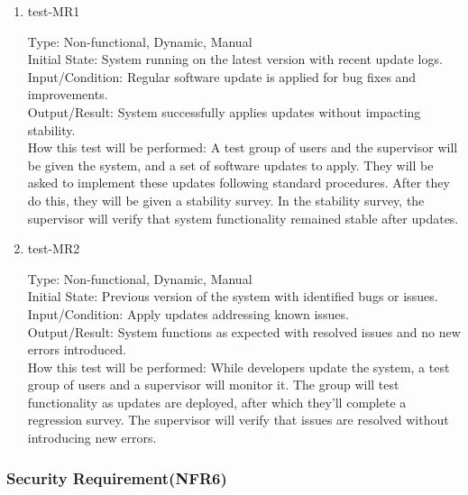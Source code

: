 \documentclass[12pt, titlepage]{article}
\begin{document}
\begin{enumerate}
    \item{test-MR1\\} \label{test-MR1}
    
    Type: Non-functional, Dynamic, Manual\\
    
    Initial State: System running on the latest version with recent update logs.\\
    
    Input/Condition: Regular software update is applied for bug fixes and improvements.\\
    
    Output/Result: System successfully applies updates without impacting stability.\\
    
    How this test will be performed: A test group of users and the supervisor will be given the system, and a set of software updates to apply. They will be asked to implement these updates following standard procedures. After they do this, they will be given a stability survey. In the stability survey, the supervisor will verify that system functionality remained stable after updates.


    \item{test-MR2\\} \label{test-MR2}
    
    Type: Non-functional, Dynamic, Manual\\

    Initial State: Previous version of the system with identified bugs or issues.\\

    Input/Condition: Apply updates addressing known issues.\\

    Output/Result: System functions as expected with resolved issues and no new errors introduced.\\

    How this test will be performed: While developers update the system, a test group of users and a supervisor will monitor it. The group will test functionality as updates are deployed, after which they'll complete a regression survey. The supervisor will verify that issues are resolved without introducing new errors.
\end{enumerate}

\subsubsection{Security Requirement(NFR6)} \label{section:4.2.6}
\end{document}
